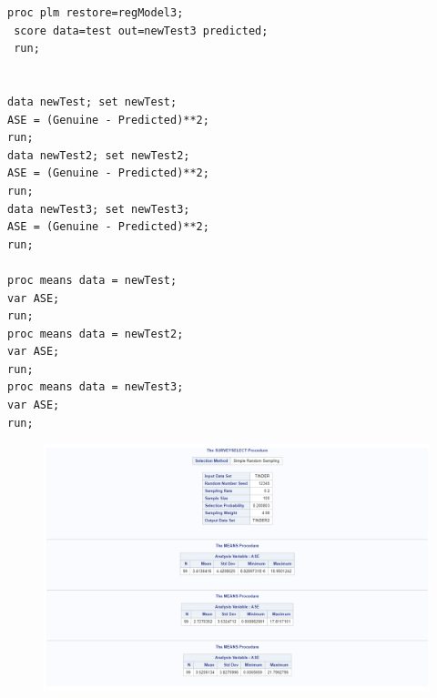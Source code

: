 \documentclass[12pt]{notes}
\begin{document}
\begin{verbatim}
proc plm restore=regModel3;
 score data=test out=newTest3 predicted; 
 run;


data newTest; set newTest;
ASE = (Genuine - Predicted)**2;
run;
data newTest2; set newTest2;
ASE = (Genuine - Predicted)**2;
run;
data newTest3; set newTest3;
ASE = (Genuine - Predicted)**2;
run;

proc means data = newTest;
var ASE;
run;
proc means data = newTest2;
var ASE;
run;
proc means data = newTest3;
var ASE;
run;
\end{verbatim}

\begin{figure}
\centering
\includegraphics[width=\textwidth]{figures/module4/results_4_3_1.png}
\end{figure}











\end{document}
